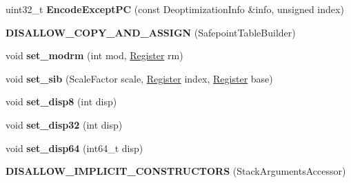 \begin{DoxyCompactItemize}
\item 
uint32\+\_\+t {\bfseries Encode\+Except\+PC} (const Deoptimization\+Info \&info, unsigned index)\hypertarget{classv8_1_1internal_1_1_b_a_s_e___e_m_b_e_d_d_e_d_a64b2e843fc4807b437cb5b82c2e59d05}{}\label{classv8_1_1internal_1_1_b_a_s_e___e_m_b_e_d_d_e_d_a64b2e843fc4807b437cb5b82c2e59d05}

\item 
{\bfseries D\+I\+S\+A\+L\+L\+O\+W\+\_\+\+C\+O\+P\+Y\+\_\+\+A\+N\+D\+\_\+\+A\+S\+S\+I\+GN} (Safepoint\+Table\+Builder)\hypertarget{classv8_1_1internal_1_1_b_a_s_e___e_m_b_e_d_d_e_d_add1190669b92da62ddcfbfaa3606d5d8}{}\label{classv8_1_1internal_1_1_b_a_s_e___e_m_b_e_d_d_e_d_add1190669b92da62ddcfbfaa3606d5d8}

\item 
void {\bfseries set\+\_\+modrm} (int mod, \hyperlink{structv8_1_1internal_1_1_register}{Register} rm)\hypertarget{classv8_1_1internal_1_1_b_a_s_e___e_m_b_e_d_d_e_d_ace658f04f71eed9f994b61f21c0c0ee1}{}\label{classv8_1_1internal_1_1_b_a_s_e___e_m_b_e_d_d_e_d_ace658f04f71eed9f994b61f21c0c0ee1}

\item 
void {\bfseries set\+\_\+sib} (Scale\+Factor scale, \hyperlink{structv8_1_1internal_1_1_register}{Register} index, \hyperlink{structv8_1_1internal_1_1_register}{Register} base)\hypertarget{classv8_1_1internal_1_1_b_a_s_e___e_m_b_e_d_d_e_d_ae6887796d6bc73446687e94e203e6544}{}\label{classv8_1_1internal_1_1_b_a_s_e___e_m_b_e_d_d_e_d_ae6887796d6bc73446687e94e203e6544}

\item 
void {\bfseries set\+\_\+disp8} (int disp)\hypertarget{classv8_1_1internal_1_1_b_a_s_e___e_m_b_e_d_d_e_d_a92e1c1723d11ba0a9f0cc65e5240e65a}{}\label{classv8_1_1internal_1_1_b_a_s_e___e_m_b_e_d_d_e_d_a92e1c1723d11ba0a9f0cc65e5240e65a}

\item 
void {\bfseries set\+\_\+disp32} (int disp)\hypertarget{classv8_1_1internal_1_1_b_a_s_e___e_m_b_e_d_d_e_d_a4f9cd1a12c4ba413dc651c97414d752c}{}\label{classv8_1_1internal_1_1_b_a_s_e___e_m_b_e_d_d_e_d_a4f9cd1a12c4ba413dc651c97414d752c}

\item 
void {\bfseries set\+\_\+disp64} (int64\+\_\+t disp)\hypertarget{classv8_1_1internal_1_1_b_a_s_e___e_m_b_e_d_d_e_d_adc4e1e78fe13c0082b076f729a650fd2}{}\label{classv8_1_1internal_1_1_b_a_s_e___e_m_b_e_d_d_e_d_adc4e1e78fe13c0082b076f729a650fd2}

\item 
{\bfseries D\+I\+S\+A\+L\+L\+O\+W\+\_\+\+I\+M\+P\+L\+I\+C\+I\+T\+\_\+\+C\+O\+N\+S\+T\+R\+U\+C\+T\+O\+RS} (Stack\+Arguments\+Accessor)\hypertarget{classv8_1_1internal_1_1_b_a_s_e___e_m_b_e_d_d_e_d_ae824b5e4ca0d0af18372fcfbdca2c58c}{}\label{classv8_1_1internal_1_1_b_a_s_e___e_m_b_e_d_d_e_d_ae824b5e4ca0d0af18372fcfbdca2c58c}


\end{DoxyCompactItemize}
